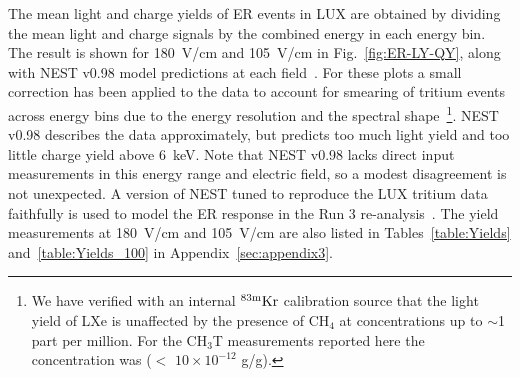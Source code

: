 The mean light and charge yields of ER events in LUX are obtained by dividing the mean light and charge signals by the combined energy in each energy bin. The result is shown for 180~V/cm and 105~V/cm in Fig.~\ref{fig:ER-LY-QY}, along with NEST v0.98 model predictions at each field~\cite{NEST_2013}. For these plots a small correction has been applied to the data to account for smearing of tritium events across energy bins due to the energy resolution and the spectral shape~\cite{Dobi_Thesis}\footnote{We have verified with an internal $\rm ^{83m}Kr$ calibration source that the light yield of LXe is unaffected by the presence of CH$_4$ at concentrations up to $\sim$1 part per million. For the CH$_3$T measurements reported here the concentration was ($<$ $10\times10^{-12}$ g/g). }.  NEST v0.98 describes the data approximately, but predicts too much light yield and too little charge yield above 6~keV. Note that NEST v0.98 lacks direct input measurements in this energy range and electric field, so a modest disagreement is not unexpected. A version of NEST tuned to reproduce the LUX tritium data faithfully is used to model the ER response in the Run 3 re-analysis~\cite{lux-reanalysis}. The yield measurements at 180~V/cm and 105~V/cm are also listed in Tables~\ref{table:Yields} and~\ref{table:Yields_100} in Appendix~\ref{sec:appendix3}.

